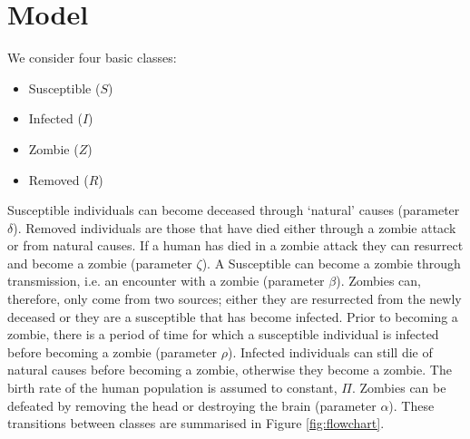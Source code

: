\documentclass[]{article}
\begin{document}


\section{Model}
\label{model}

We consider four basic classes:
\begin{itemize}
	\item Susceptible ($S$)
	\item Infected ($I$)
	\item Zombie ($Z$)
	\item Removed ($R$)
\end{itemize}

Susceptible individuals can become deceased through `natural' causes (parameter $\delta$). Removed individuals are those that have died either through a zombie attack or from natural causes. If a human has died in a zombie attack they can resurrect and become a zombie (parameter $\zeta$). A Susceptible can become a zombie through transmission, i.e. an encounter with a zombie (parameter $\beta$). Zombies can, therefore, only come from two sources; either they are resurrected from the newly deceased or they are a susceptible that has become infected. Prior to becoming a zombie, there is a period of time for which a susceptible individual is infected before becoming a zombie (parameter $\rho$). Infected individuals can still die of natural causes before becoming a zombie, otherwise they become a zombie. The birth rate of the human population is assumed to constant, $\Pi$. Zombies can be defeated by removing the head or destroying the brain (parameter $\alpha$). These transitions between classes are summarised in Figure \ref{fig:flowchart}.
\end{document}
